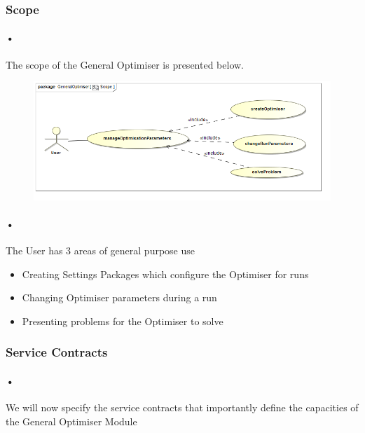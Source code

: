 \documentclass[11pt]{article}
\begin{document}
\subsubsection{Scope}
\paragraph{•}
The scope of the General Optimiser is presented below.
\begin{figure}[H]
\includegraphics[scale=0.45]{Scope.png}
\end{figure}

\paragraph{•}
The User has 3 areas of general purpose use
\begin{itemize}
\item Creating Settings Packages which configure the Optimiser for runs
\item Changing Optimiser parameters during a run
\item Presenting problems for the Optimiser to solve
\end{itemize}
\subsubsection{Service Contracts}
\paragraph{•}
We will now specify the service contracts that importantly define the capacities of the General Optimiser Module
\end{document}
